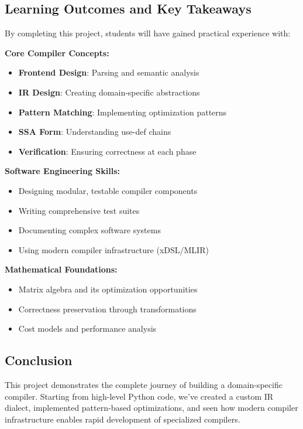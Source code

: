 \documentclass[11pt,a4paper]{article}
\begin{document}
\subsection{Learning Outcomes and Key Takeaways}

By completing this project, students will have gained practical experience with:

\textbf{Core Compiler Concepts:}
\begin{itemize}
    \item \textbf{Frontend Design}: Parsing and semantic analysis
    \item \textbf{IR Design}: Creating domain-specific abstractions
    \item \textbf{Pattern Matching}: Implementing optimization patterns
    \item \textbf{SSA Form}: Understanding use-def chains
    \item \textbf{Verification}: Ensuring correctness at each phase
\end{itemize}

\textbf{Software Engineering Skills:}
\begin{itemize}
    \item Designing modular, testable compiler components
    \item Writing comprehensive test suites
    \item Documenting complex software systems
    \item Using modern compiler infrastructure (xDSL/MLIR)
\end{itemize}

\textbf{Mathematical Foundations:}
\begin{itemize}
    \item Matrix algebra and its optimization opportunities
    \item Correctness preservation through transformations
    \item Cost models and performance analysis
\end{itemize}

\subsection{Conclusion}

This project demonstrates the complete journey of building a domain-specific compiler. Starting from high-level Python code, we've created a custom IR dialect, implemented pattern-based optimizations, and seen how modern compiler infrastructure enables rapid development of specialized compilers.
\end{document}
